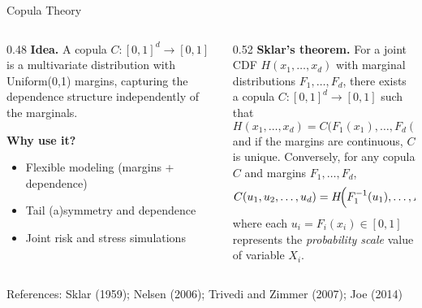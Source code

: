 \begin{frame}{Copula Theory}
\footnotesize
\begin{columns}[T]
\begin{column}{0.48\textwidth}
\textbf{Idea.}  
A copula $C:[0,1]^d\!\to[0,1]$ is a multivariate distribution 
with Uniform(0,1) margins, capturing the dependence structure 
independently of the marginals.

\vspace{0.5cm}
\textbf{Why use it?}
\begin{itemize}
  \item Flexible modeling (margins + dependence)
  \item Tail (a)symmetry and dependence
  \item Joint risk and stress simulations
\end{itemize}
\end{column}

\begin{column}{0.52\textwidth}
\textbf{Sklar’s theorem.}
For a joint CDF $H(x_1,\dots,x_d)$ with marginal distributions $F_1,\dots,F_d$, there exists a copula $C:[0,1]^d\!\to[0,1]$ such that
\[
H(x_1,\dots,x_d)
  = C\!\big(F_1(x_1),\dots,F_d(x_d)\big),
\]
and if the margins are continuous, $C$ is unique. Conversely, for any copula $C$ and margins $F_1,\dots,F_d$,
\[
C(u_1, u_2, \dots, u_d)
  = H\!\Bigl(F_1^{-1}(u_1), \dots, F_d^{-1}(u_d)\Bigr),
\]
where each $u_i = F_i(x_i) \in [0,1]$ represents the \textit{probability scale} value of variable $X_i$.
\end{column}
\end{columns}

\vfill
\begin{flushright}
{\tiny References: Sklar (1959); Nelsen (2006); Trivedi and Zimmer (2007); Joe (2014)}
\end{flushright}

\end{frame}



